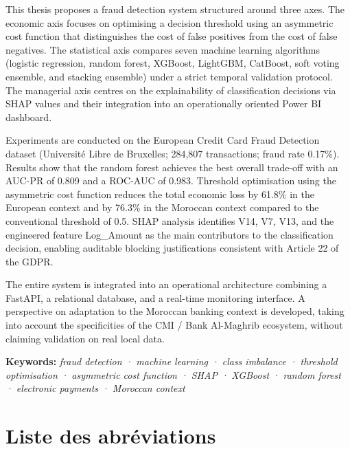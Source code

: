This thesis proposes a fraud detection system structured around three axes. The economic axis focuses on optimising a decision threshold using an asymmetric cost function that distinguishes the cost of false positives from the cost of false negatives. The statistical axis compares seven machine learning algorithms (logistic regression, random forest, XGBoost, LightGBM, CatBoost, soft voting ensemble, and stacking ensemble) under a strict temporal validation protocol. The managerial axis centres on the explainability of classification decisions via SHAP values and their integration into an operationally oriented Power BI dashboard.

Experiments are conducted on the European Credit Card Fraud Detection dataset (Université Libre de Bruxelles; 284,807 transactions; fraud rate 0.17\%). Results show that the random forest achieves the best overall trade-off with an AUC-PR of 0.809 and a ROC-AUC of 0.983. Threshold optimisation using the asymmetric cost function reduces the total economic loss by 61.8\% in the European context and by 76.3\% in the Moroccan context compared to the conventional threshold of 0.5. SHAP analysis identifies V14, V7, V13, and the engineered feature Log\_Amount as the main contributors to the classification decision, enabling auditable blocking justifications consistent with Article 22 of the GDPR.

The entire system is integrated into an operational architecture combining a FastAPI, a relational database, and a real-time monitoring interface. A perspective on adaptation to the Moroccan banking context is developed, taking into account the specificities of the CMI / Bank Al-Maghrib ecosystem, without claiming validation on real local data.

\textbf{Keywords: }\emph{fraud detection · machine learning · class imbalance · threshold }\emph{optimisation}\emph{ · asymmetric cost function · SHAP · }\emph{XGBoost}\emph{ · random forest · electronic payments · Moroccan context}

\chapter*{Liste des abréviations}

